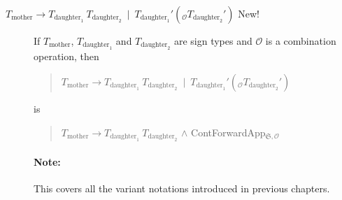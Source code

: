 \begin{description}



  

\item[\textnormal{$T_{\text{mother}}\longrightarrow
    T_{\text{daughter}_1}\ T_{\text{daughter}_2}\ \mid\
    T_{\text{daughter}_1}'(_{\mathcal{O}}T_{\text{daughter}_2}')$}
  New!] \mbox{}

  If $T_{\text{mother}}$, $T_{\text{daughter}_1}$ and
  $T_{\text{daughter}_2}$ are sign types and $\mathcal{O}$ is a
  combination operation, then
  \begin{quote}
    $T_{\text{mother}}\longrightarrow
    T_{\text{daughter}_1}\ T_{\text{daughter}_2}\ \mid\
    T_{\text{daughter}_1}'(_{\mathcal{O}}T_{\text{daughter}_2}')$
  \end{quote}
  is
  \begin{quote}
  $T_{\text{mother}}\longrightarrow
    T_{\text{daughter}_1}\ T_{\text{daughter}_2}$ \d{\d{$\wedge$}}
    ContForwardApp$_{\mathfrak{S},\mathcal{O}}$
  \end{quote}

  \paragraph{Note:} This covers all the variant notations introduced
  in previous chapters.






\end{description}

